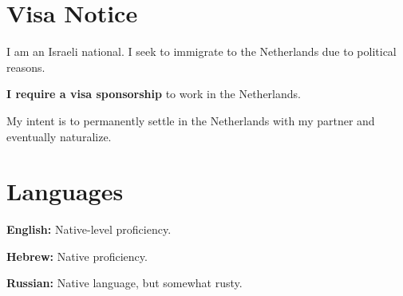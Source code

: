 \documentclass[a4paper,11pt]{article}
\begin{document}
\section{Visa Notice}
\begin{itemList}
    \item I am an Israeli national. I seek to immigrate to the Netherlands due to political reasons.
    \item \textbf{I require a visa sponsorship} to work in the Netherlands.
    \item My intent is to permanently settle in the Netherlands with my partner and eventually naturalize.
\end{itemList}
\section{Languages}
\begin{itemList}
    \item \textbf{English:} Native-level proficiency.
    \item \textbf{Hebrew:} Native proficiency.
    \item \textbf{Russian:} Native language, but somewhat rusty.
\end{itemList}
\end{document}
